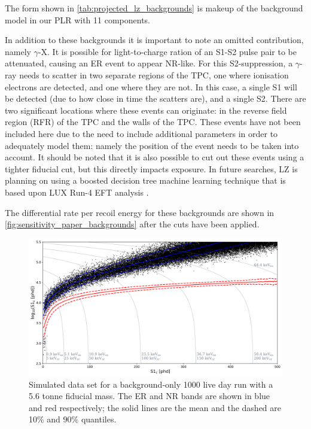 The form shown in \autoref{tab:projected_lz_backgrounds} is makeup of the background model in our PLR with 11 components.
\par
In addition to these backgrounds it is important to note an omitted contribution, namely $\gamma$-X.
It is possible for light-to-charge ration of an S1-S2 pulse pair to be attenuated, causing an ER event to appear NR-like.
For this S2-suppression, a $\gamma$-ray needs to scatter in two separate regions of the TPC, one where ionisation electrons are detected, and one where they are not.
In this case, a single S1 will be detected (due to how close in time the scatters are), and a single S2.
There are two significant locations where these events can originate: in the reverse field region (RFR) of the TPC and the walls of the TPC.
These events have not been included here due to the need to include additional parameters in order to adequately model them: namely the position of the event needs to be taken into account.
It should be noted that it is also possible to cut out these events using a tighter fiducial cut, but this directly impacts exposure.
In future searches, LZ is planning on using a boosted decision tree machine learning technique that is based upon LUX Run-4 EFT analysis \cite{LUX_RUN4_EFT_2021}.
\par
The differential rate per recoil energy for these backgrounds are shown in \autoref{fig:sensitivity_paper_backgrounds} after the cuts have been applied.


\begin{figure}
    \centering
    \includegraphics[width=15cm]{Figures/EFT/Projected_backgrounds/projected_backgrounds_s1_s2.png}
    \caption{Simulated data set for a background-only 1000 live day run with a 5.6 tonne fiducial mass. The ER and NR bands are shown in blue and red respectively; the solid lines are the mean and the dashed are 10\% and 90\% quantiles.}
    \label{fig:my_label}
\end{figure}





